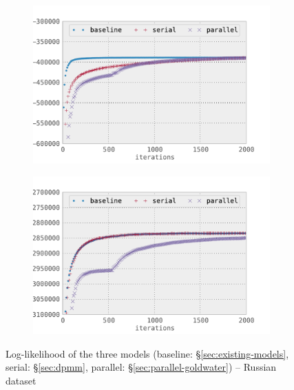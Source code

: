 \begin{figure}[h]
    \center
    \begin{subfigure}{0.48\textwidth}
        \includegraphics[width=\textwidth]{fig/base_ll}
        \label{fig:ll_base}
    \end{subfigure}
    \begin{subfigure}{0.48\textwidth}
        \includegraphics[width=\textwidth]{fig/crp_ll}
        \label{fig:ll_crp}
    \end{subfigure}
    \caption{Log-likelihood of the three models (baseline: \S\ref{sec:existing-models}, serial: \S\ref{sec:dpmm}, parallel: \S\ref{sec:parallel-goldwater}) -- Russian dataset}
    \label{fig:ll}
\end{figure}


